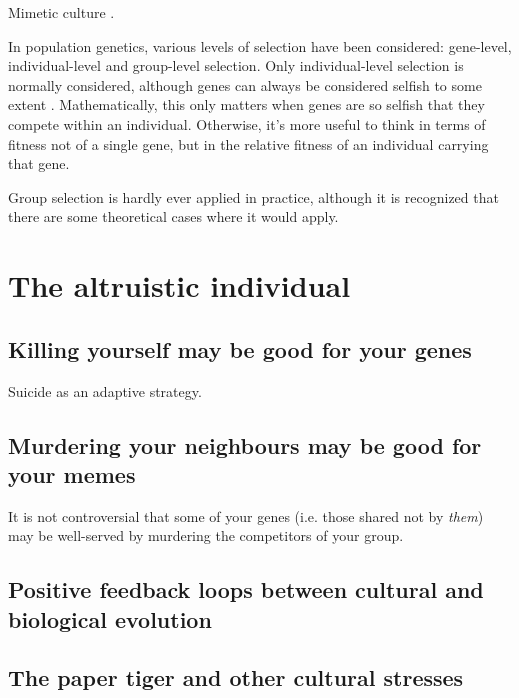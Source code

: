 \documentclass{article}
\begin{document}
Mimetic culture \citet{donald1991}.




In population genetics, various levels of selection have been considered: gene-level, individual-level and group-level selection. Only individual-level selection is normally considered, although genes can always be considered selfish to some extent \citep{dawkins1976}. Mathematically, this only matters when genes are so selfish that they compete within an individual. Otherwise, it's more useful to think in terms of fitness not of a single gene, but in the relative fitness of an individual carrying that gene.

Group selection is hardly ever applied in practice, although it is recognized that there are some theoretical cases where it would apply.


\section{The altruistic individual}

\subsection{Killing yourself may be good for your genes}

Suicide as an adaptive strategy.

\subsection{Murdering your neighbours may be good for your memes}

It is not controversial that some of your genes (i.e. those shared not by \emph{them}) may be well-served by murdering the competitors of your group.

\subsection{Positive feedback loops between cultural and biological evolution}

\subsection{The paper tiger and other cultural stresses}
\end{document}
